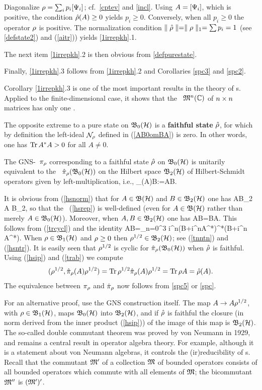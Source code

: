 Diagonalize $\rho=\sum_i p_i [\Psi_i]$; cf.\ \ref{cptev} and \ref{incl}.
Using $A=[\Psi_i]$, which is positive, the condition $\hat{\rho}(A)\geq
0$ yields $p_i\geq 0$. Conversely, when all $p_i\geq 0$ the operator
$\rho$ is positive. The normalization condition
$\parallel\hat{\rho}\parallel=\parallel\rho\parallel_1= \sum p_i=1$ (see \ref{defstate2}) and
(\ref{aitr})) yields \ref{1irrepkh}.1.

The next item \ref{1irrepkh}.2 is then obvious from
\ref{defpurestate}.

Finally, \ref{1irrepkh}.3 follows from \ref{1irrepkh}.2 and
Corollaries \ref{spc3} and \ref{spc2}.  \enp

Corollary \ref{1irrepkh}.3 is one of the most important results in the
theory of \ca s. Applied to the finite-dimensional case, it shows that
the \ca\ ${\frak M}^n({\Bbb C})$ of $n\times n$ matrices has only one \irrep.

The opposite extreme to a pure state on ${\frak B}_0({\cal H})$ is a {\bf faithful
 state} $\hat{\rho}$, for which by definition the left-ideal
 ${\cal N}_{\rho}$ defined in (\ref{AB0omBA}) is zero. In other words, one
 has $\mbox{\rm Tr}\, A^*A>0$ for all $A\neq 0$.
\begin{Proposition}
The GNS-\rep\ $\pi_{\rho}$ corresponding to a faithful state
$\hat{\rho}$ on ${\frak B}_0({\cal H})$ is unitarily equivalent to the \rep\
$\hat{\pi}_{\rho}({\frak B}_0({\cal H}))$ on the Hilbert space ${\frak B}_2({\cal H})$ of
Hilbert-Schmidt operators given by left-multiplication, i.e., \be
\hat{\pi}_{\rh}(A)B:=AB. \ll{hsrep} \ee
\end{Proposition}

It is obvious from (\ref{hsnorm}) that for $A\in{\frak B}({\cal H})$ and
$B\in{\frak B}_2({\cal H})$ one has \be \n AB\n_2\,\leq\, \n A\n\: \n B\n_2, \ee so
that the \rep\ (\ref{hsrep}) is well-defined (even for $A\in{\frak B}({\cal H})$
rather than merely $A\in{\frak B}_0({\cal H})$). Moreover, when $A,B\in{\frak B}_2({\cal H})$ one has
\be \Tr AB=\Tr BA.\ll{trab} \ee This follows from (\ref{trcycl}) and
the identity \be AB=\quar\sum_{n=0}^3 i^n(B+i^nA^*)^*(B+i^n A^*).  \ee
When $\rho\in{\frak B}_1({\cal H})$ and $\rho\geq 0$ then $\rho^{1/2}\in{\frak B}_2({\cal H})$; see
(\ref{tnntn}) and (\ref{hsntr}).  It is easily seen that $\rho^{1/2}$
is cyclic for $\hat{\pi}_{\rho}({\frak B}_0({\cal H}))$ when $\hat{\rho}$ is faithful.
Using (\ref{hsip}) and (\ref{trab}) we compute
$$
(\rho^{1/2},\hat{\pi}_{\rho}(A)\rho^{1/2})=\mbox{\rm Tr}\,
\rho^{1/2}\hat{\pi}_{\rho}(A)\rho^{1/2}=\mbox{\rm Tr}\, \rho A=\hat{\rho}(A).
$$
The equivalence between $\pi_{\rho}$ and $\hat{\pi}_{\rho}$ now follows
from \ref{spc5} or \ref{spc}.\enp

For an alternative proof, use the GNS construction itself.  The map
$A\rightarrow A\rho^{1/2}$, with $\rho\in {\frak B}_1({\cal H})$, maps ${\frak B}_0({\cal H})$
into ${\frak B}_2({\cal H})$, and if $\hat{\rho}$ is faithful the closure (in norm
derived from the inner product (\ref{hsip})) of the image of this map
is ${\frak B}_2({\cal H})$.  \su{The double commutant theorem} The so-called double
commutant theorem was proved by von Neumann in 1929, and remains a
central result in operator algebra theory. For example, although it is
a statement about von Neumann algebras, it controls the
(ir)reducibility of \rep s.  Recall that the commutant ${\frak M}'$ of a
collection ${\frak M}$ of bounded operators consists of all bounded operators
which commute with all elements of ${\frak M}$; the bicommutant ${\frak M}''$ is
$({\frak M}')'$.

